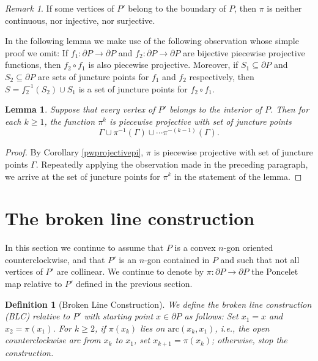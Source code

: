 \documentclass[11pt]{amsart}
\newtheorem{lemma}[theorem]{Lemma}
\newtheorem{definition}[theorem]{Definition}
\theoremstyle{remark}
\newtheorem{remark}[theorem]{Remark}
\numberwithin{equation}{section}
\newcommand{\arc}{\mathrm{arc}}
\renewcommand{\geq}{\geqslant}
\begin{document}
\begin{remark}
If some vertices of $P'$ belong to the boundary of $P$,
then $\pi$ is neither continuous, nor injective, nor surjective.
\end{remark}

 In the following lemma we make use  of the following observation whose simple proof we omit:  If $f_1\colon \partial P\to \partial P$ and $f_2\colon \partial P\to \partial P$  are bijective piecewise projective functions, then $f_2\circ f_1$ is also piecewise projective. Moreover, if $S_1\subseteq \partial P$ and $S_2\subseteq \partial P$ are  sets of juncture points for $f_1$ and $f_2$ respectively, then $S=f_2^{-1}(S_2)\cup S_1$ is a set of juncture points for $f_2\circ f_1$.


\begin{lemma}\label{junctures}
Suppose that every vertex of $P'$ belongs to the interior of $P$. Then for each $k\geq 1$, the function  $\pi^k$ is piecewise projective with set of juncture points
\[
\Gamma\cup \pi^{-1}(\Gamma)\cup \cdots \pi^{-(k-1)}(\Gamma).
\] 
\end{lemma}

\begin{proof}
By Corollary \ref{pwprojectivepi}, $\pi$ is piecewise projective with set of juncture points $\Gamma$. Repeatedly applying the observation made in the preceding paragraph, we arrive at the set of juncture points for  $\pi^k$ in the statement of the lemma.
\end{proof}




\section{The broken line construction}
In this section we  continue to assume that $P$ is a convex  $n$-gon oriented counterclockwise, and that $P'$ is an $n$-gon contained in $P$ and such that  not all vertices of $P'$ are collinear. We continue to denote by  $\pi\colon \partial P\to \partial P$ the Poncelet map  relative to $P'$ defined in the previous section. 

\begin{definition}[Broken Line Construction]\label{BLC}
We define the broken line construction (BLC) relative to $P'$ with starting point $x\in\partial P$ as follows: 
Set $x_1=x$ and $x_2=\pi(x_1)$. For $k\geq 2$, if $\pi(x_k)$ lies on $\arc(x_k,x_1)$, i.e., the open counterclockwise arc from $x_k$ to $x_1$, set $x_{k+1}=\pi(x_k)$; otherwise, stop the construction. 
\end{definition}
\end{document}
